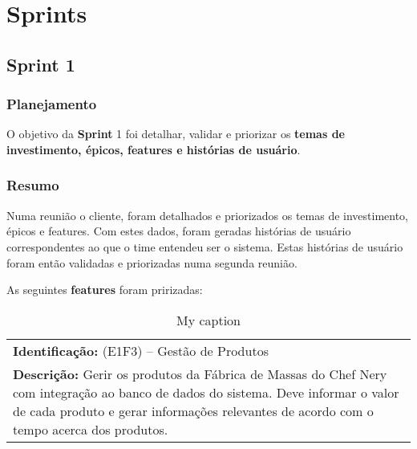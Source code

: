 
\chapter[Sprints]{Sprints}


\section{\large{Sprint 1}}

\subsection{Planejamento}
    O objetivo da \textbf{Sprint} 1 foi detalhar, validar e priorizar os \textbf{temas de investimento, épicos, features e histórias de usuário}.

\subsection{Resumo}
    Numa reunião o cliente, foram detalhados e priorizados os temas de investimento, épicos e features. Com estes dados, foram geradas histórias de usuário correspondentes ao que o time entendeu ser o sistema. Estas histórias de usuário foram então validadas e priorizadas numa segunda reunião.

    As seguintes \textbf{features} foram pririzadas:

    \begin{table}[]
    \centering
    \caption{My caption}
    \label{my-label}
    \begin{tabular}{l}
    \textbf{Identificação:} (E1F3) – Gestão de Produtos                                                                                                                                                                                  \\
    \textbf{Descrição:} Gerir os produtos da Fábrica de Massas do Chef Nery com integração ao banco de dados do sistema. Deve informar o valor de cada produto e gerar informações relevantes de acordo com o tempo acerca dos produtos.
    \end{tabular}
    \end{table}
